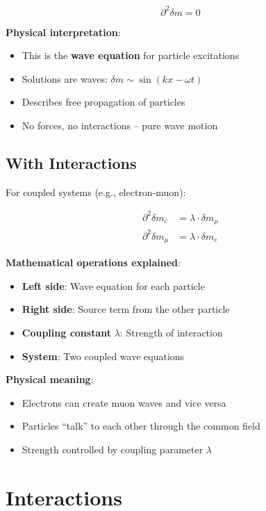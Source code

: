 \documentclass[12pt,a4paper]{article}
\newcommand{\deltam}{\delta m}
\theoremstyle{definition}
\theoremstyle{remark}
\begin{document}
	\begin{equation}
		\boxed{\partial^2 \deltam = 0}
		\label{eq:field_equation}
	\end{equation}
	
	\textbf{Physical interpretation}: 
	\begin{itemize}
		\item This is the \textbf{wave equation} for particle excitations
		\item Solutions are waves: $\deltam \sim \sin(kx - \omega t)$
		\item Describes free propagation of particles
		\item No forces, no interactions -- pure wave motion
	\end{itemize}
	
	\subsection{With Interactions}
	
	For coupled systems (e.g., electron-muon):
	
	\begin{align}
		\partial^2 \deltam_e &= \lambda \cdot \deltam_{\mu} \\
		\partial^2 \deltam_{\mu} &= \lambda \cdot \deltam_e
	\end{align}
	
	\textbf{Mathematical operations explained}:
	\begin{itemize}
		\item \textbf{Left side}: Wave equation for each particle
		\item \textbf{Right side}: Source term from the other particle
		\item \textbf{Coupling constant} $\lambda$: Strength of interaction
		\item \textbf{System}: Two coupled wave equations
	\end{itemize}
	
	\textbf{Physical meaning}:
	\begin{itemize}
		\item Electrons can create muon waves and vice versa
		\item Particles ``talk'' to each other through the common field
		\item Strength controlled by coupling parameter $\lambda$
	\end{itemize}
	

	\section{Interactions}
	
\end{document}
